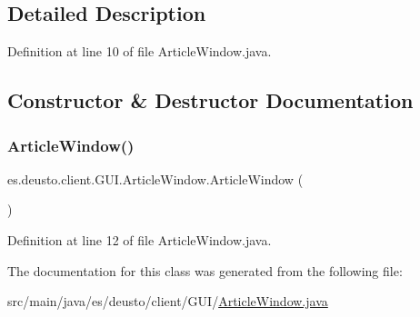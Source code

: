 \subsection{Detailed Description}


Definition at line 10 of file Article\+Window.\+java.



\subsection{Constructor \& Destructor Documentation}
\mbox{\label{classes_1_1deusto_1_1client_1_1_g_u_i_1_1_article_window_a32785c5a8d12fccb60c87c7dacf53e7f}} 
\subsubsection{\texorpdfstring{Article\+Window()}{ArticleWindow()}}
{\footnotesize\ttfamily es.\+deusto.\+client.\+G\+U\+I.\+Article\+Window.\+Article\+Window (\begin{DoxyParamCaption}{ }\end{DoxyParamCaption})}



Definition at line 12 of file Article\+Window.\+java.



The documentation for this class was generated from the following file\+:\begin{DoxyCompactItemize}
\item 
src/main/java/es/deusto/client/\+G\+U\+I/\hyperlink{_article_window_8java}{Article\+Window.\+java}\end{DoxyCompactItemize}
